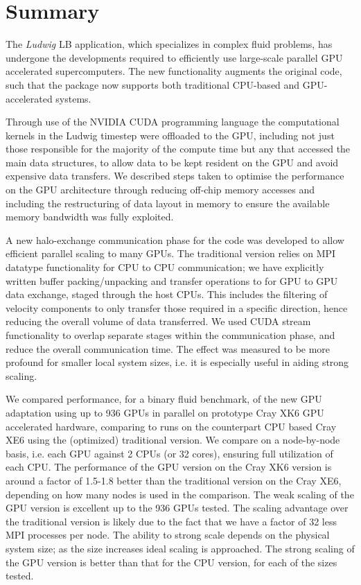 \section{Summary}

The \textit{Ludwig} LB application, which specializes
in complex fluid problems, has undergone the developments required to
efficiently use large-scale parallel GPU accelerated supercomputers.
The new functionality augments the original code, such that the
package now supports both traditional CPU-based and GPU-accelerated
systems. 

Through use of the NVIDIA CUDA programming language the computational
kernels in the Ludwig timestep were offloaded to the GPU, including
not just those responsible for the majority of the compute time but
any that accessed the main data structures, to allow data to be kept
resident on the GPU and avoid expensive data transfers. We described
steps taken to optimise the performance on the GPU architecture through
reducing off-chip memory accesses and including the restructuring of
data layout in memory to ensure the available memory bandwidth was
fully exploited.

A new halo-exchange communication phase for the code was developed to
allow efficient parallel scaling to many GPUs. The traditional version
relies on MPI datatype functionality for CPU to CPU communication; we
have explicitly written buffer packing/unpacking and transfer
operations to for GPU to GPU data exchange, staged through the host
CPUs. This includes the filtering of velocity components to only
transfer those required in a specific direction, hence reducing the
overall volume of data transferred. We used CUDA stream functionality
to overlap separate stages within the communication phase, and reduce
the overall communication time. The effect was measured to be more
profound for smaller local system sizes, i.e. it is especially useful
in aiding strong scaling.

We compared performance, for a binary fluid benchmark, of the new GPU
adaptation using up to 936 GPUs in parallel on prototype Cray XK6 GPU
accelerated hardware, comparing to runs on the counterpart CPU based
Cray XE6 using the (optimized) traditional version. We compare on a
node-by-node basis, i.e. each GPU against 2 CPUs (or 32 cores),
ensuring full utilization of each CPU.  The performance of the GPU
version on the Cray XK6 version is around a factor of 1.5-1.8 better
than the traditional version on the Cray XE6, depending on how many
nodes is used in the comparison. The weak scaling of the GPU version
is excellent up to the 936 GPUs tested. The scaling advantage over the
traditional version is likely due to the fact that we have a factor of
32 less MPI processes per node. The ability to strong scale depends on
the physical system size; as the size increases ideal scaling is
approached. The strong scaling of the GPU version is better than that
for the CPU version, for each of the sizes tested.

